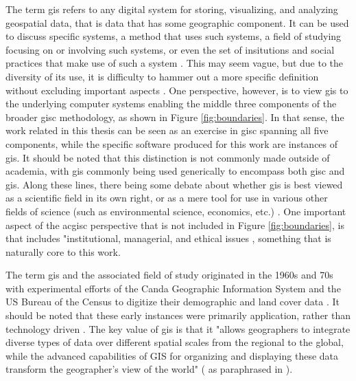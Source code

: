 The term \ac{gis} refers to any digital system for storing, visualizing, and analyzing geospatial data, that is data that has some geographic component. It can be used to discuss specific systems, a method that uses such systems, a field of studying focusing on or involving such systems, or even the set of insitutions and social practices that make use of such a system \cite{sheppardGISSocietyResearch1995}. This may seem vague, but due to the diversity of its use, it is difficulty to hammer out a more specific definition without excluding important aspects \cite{goodchildOverviewDefinitionGIS1992, picklesToolScienceGIS1997, chrismanWhatDoesGIS1999, heikkilaGISDeadLong1998}. One perspective, however, is to view \ac{gis} to the underlying computer systems enabling the middle three components of the broader \ac{gisc} methodology, as shown in Figure \ref{fig:boundaries}. In that sense, the work related in this thesis can be seen as an exercise in \ac{gisc} spanning all five components, while the specific software produced for this work are instances of \ac{gis}. It should be noted that this distinction is not commonly made outside of academia, with \ac{gis} commonly being used generically to encompass both \ac{gisc} and \ac{gis}. Along these lines, there being some debate about whether \ac{gis} is best viewed as a scientific field in its own right, or as a mere tool for use in various other fields of science (such as environmental science, economics, etc.) \cite{goodchildGeographicalInformationScience1992,goodchildTwentyYearsProgress2010}. One important aspect of the 
ac{gisc} perspective that is not included in Figure \ref{fig:boundaries}, is that includes "institutional, managerial, and ethical issues \cite{goodchildGeographicalInformationScience1992}, something that is naturally core to this work. 

The term \ac{gis} and the associated field of study originated in the 1960s and 70s with experimental efforts of the Canda Geographic Information System and the US Bureau of the Census to digitize their demographic and land cover data \cite{goodchildGeographicInformationSystems1994}. It should be noted that these early instances were primarily application, rather than technology driven \cite{goodchildGeographicalInformationScience1992}. The key value of \ac{gis} is that it "allows geographers to integrate diverse types of data over different spatial scales from the regional to the global, while the advanced capabilities of GIS for organizing and displaying these data transform the geographer's view of the world" (\cite{tomlinsonPRESIDENTIALADDRESSGEOGRAPHIC1989} as paraphrased in \cite{vereginComputerInnovationAdoption1994}).

